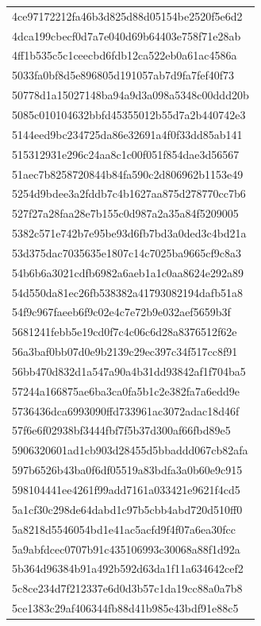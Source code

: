 \begin{tabular}{l}
4ce97172212fa46b3d825d88d05154be2520f5e6d2 \\
4dca199cbecf0d7a7e040d69b64403e758f71e28ab \\
4ff1b535c5c1ceecbd6fdb12ca522eb0a61ac4586a \\
5033fa0bf8d5e896805d191057ab7d9fa7fef40f73 \\
50778d1a15027148ba94a9d3a098a5348c00ddd20b \\
5085c010104632bbfd45355012b55d7a2b440742e3 \\
5144eed9bc234725da86e32691a4f0f33dd85ab141 \\
515312931e296c24aa8c1c00f051f854dae3d56567 \\
51aec7b8258720844b84fa590c2d806962b1153e49 \\
5254d9bdee3a2fddb7c4b1627aa875d278770cc7b6 \\
527f27a28faa28e7b155c0d987a2a35a84f5209005 \\
5382c571e742b7e95be93d6fb7bd3a0ded3c4bd21a \\
53d375dac7035635e1807c14c7025ba9665cf9c8a3 \\
54b6b6a3021cdfb6982a6aeb1a1c0aa8624e292a89 \\
54d550da81ec26fb538382a41793082194dafb51a8 \\
54f9c967faeeb6f9c02e4c7e72b9e032aef5659b3f \\
5681241febb5e19cd0f7c4c06c6d28a8376512f62e \\
56a3baf0bb07d0e9b2139c29ec397c34f517cc8f91 \\
56bb470d832d1a547a90a4b31dd93842af1f704ba5 \\
57244a166875ae6ba3ca0fa5b1c2e382fa7a6edd9e \\
5736436dca6993090ffd733961ac3072adac18d46f \\
57f6e6f02938bf3444fbf7f5b37d300af66fbd89e5 \\
5906320601ad1cb903d28455d5bbaddd067cb82afa \\
597b6526b43ba0f6df05519a83bdfa3a0b60e9c915 \\
598104441ee4261f99add7161a033421e9621f4cd5 \\
5a1cf30c298de64dabd1c97b5cbb4abd720d510ff0 \\
5a8218d5546054bd1e41ac5acfd9f4f07a6ea30fcc \\
5a9abfdcec0707b91c435106993c30068a88f1d92a \\
5b364d96384b91a492b592d63da1f11a634642cef2 \\
5c8ce234d7f212337e6d0d3b57c1da19cc88a0a7b8 \\
5ce1383c29af406344fb88d41b985e43bdf91e88c5 \\

\end{tabular}

